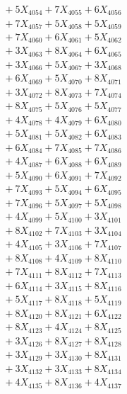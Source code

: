 \documentclass[a4paper,10pt]{article}
\begin{document}
{\begin{align}
&\;  + 5 X_{4054} + 7 X_{4055} + 6 X_{4056} \\[0.3ex]
&\;  + 7 X_{4057} + 5 X_{4058} + 5 X_{4059} \\[0.5ex]\allowbreak
&\;  + 7 X_{4060} + 6 X_{4061} + 5 X_{4062} \\[0.3ex]
&\;  + 3 X_{4063} + 8 X_{4064} + 6 X_{4065} \\[0.3ex]
&\;  + 3 X_{4066} + 5 X_{4067} + 3 X_{4068} \\[0.3ex]
&\;  + 6 X_{4069} + 5 X_{4070} + 8 X_{4071} \\[0.3ex]
&\;  + 3 X_{4072} + 8 X_{4073} + 7 X_{4074} \\[0.3ex]
&\;  + 8 X_{4075} + 5 X_{4076} + 5 X_{4077} \\[0.3ex]
&\;  + 4 X_{4078} + 4 X_{4079} + 6 X_{4080} \\[0.3ex]
&\;  + 5 X_{4081} + 5 X_{4082} + 6 X_{4083} \\[0.3ex]
&\;  + 6 X_{4084} + 7 X_{4085} + 7 X_{4086} \\[0.3ex]
&\;  + 4 X_{4087} + 6 X_{4088} + 6 X_{4089} \\[0.5ex]\allowbreak
&\;  + 5 X_{4090} + 6 X_{4091} + 7 X_{4092} \\[0.3ex]
&\;  + 7 X_{4093} + 5 X_{4094} + 6 X_{4095} \\[0.3ex]
&\;  + 7 X_{4096} + 5 X_{4097} + 5 X_{4098} \\[0.3ex]
&\;  + 4 X_{4099} + 5 X_{4100} + 3 X_{4101} \\[0.3ex]
&\;  + 8 X_{4102} + 7 X_{4103} + 3 X_{4104} \\[0.3ex]
&\;  + 4 X_{4105} + 3 X_{4106} + 7 X_{4107} \\[0.3ex]
&\;  + 8 X_{4108} + 4 X_{4109} + 8 X_{4110} \\[0.3ex]
&\;  + 7 X_{4111} + 8 X_{4112} + 7 X_{4113} \\[0.3ex]
&\;  + 6 X_{4114} + 3 X_{4115} + 8 X_{4116} \\[0.3ex]
&\;  + 5 X_{4117} + 8 X_{4118} + 5 X_{4119} \\[0.5ex]\allowbreak
&\;  + 8 X_{4120} + 8 X_{4121} + 6 X_{4122} \\[0.3ex]
&\;  + 8 X_{4123} + 4 X_{4124} + 8 X_{4125} \\[0.3ex]
&\;  + 3 X_{4126} + 8 X_{4127} + 8 X_{4128} \\[0.3ex]
&\;  + 3 X_{4129} + 3 X_{4130} + 8 X_{4131} \\[0.3ex]
&\;  + 3 X_{4132} + 3 X_{4133} + 8 X_{4134} \\[0.3ex]
&\;  + 4 X_{4135} + 8 X_{4136} + 4 X_{4137} \\[0.3ex]

\end{align}}
\end{document}

